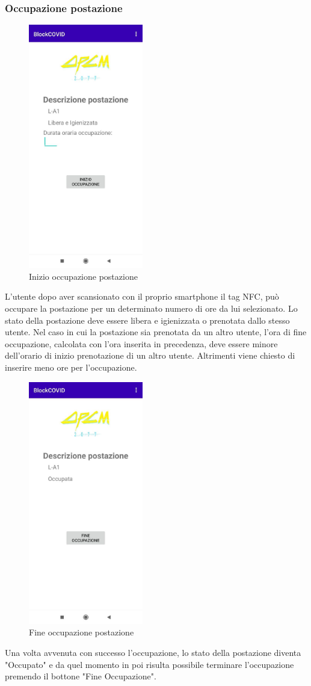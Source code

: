 	\subsubsection{Occupazione postazione}
	\begin{figure}[H]
		\centering
		\includegraphics[width=5cm]{res/images/inizioOccupazione.png}
		\caption{Inizio occupazione postazione}
	\end{figure}
	L'utente dopo aver scansionato con il proprio smartphone il tag NFC, può occupare la postazione per un determinato numero di ore da lui selezionato. Lo stato della postazione deve essere libera e igienizzata o prenotata dallo stesso utente. Nel caso in cui la postazione sia prenotata da un altro utente, l'ora di fine occupazione, calcolata con l'ora inserita in precedenza, deve essere minore dell'orario di inizio prenotazione di un altro utente. Altrimenti viene chiesto di inserire meno ore per l'occupazione.
	\begin{figure}[H]
		\centering
		\includegraphics[width=5cm]{res/images/occupata.png}
		\caption{Fine occupazione postazione}
	\end{figure}
	Una volta avvenuta con successo l'occupazione, lo stato della postazione diventa "Occupato" e da quel momento in poi risulta possibile terminare l'occupazione premendo il bottone "Fine Occupazione".
